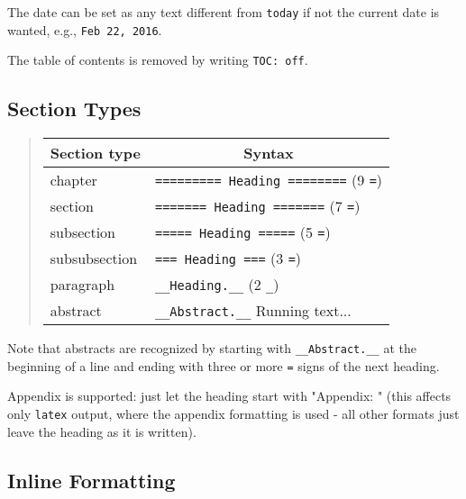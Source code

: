 \documentclass[twoside]{article}
\begin{document}
The date can be set as any text different from {\fontsize{10pt}{10pt}\verb!today!} if not the
current date is wanted, e.g., {\fontsize{10pt}{10pt}\verb!Feb 22, 2016!}.

The table of contents is removed by writing {\fontsize{10pt}{10pt}\verb!TOC: off!}.

\subsection{Section Types}

\label{quick:sections}


\begin{quote}\begin{tabular}{ll}
\hline
\multicolumn{1}{c}{Section type} & \multicolumn{1}{c}{Syntax} \\
\hline
chapter                              & {\fontsize{10pt}{10pt}\verb!========= Heading ========!} (9 {\fontsize{10pt}{10pt}\verb!=!}) \\
section                              & {\fontsize{10pt}{10pt}\verb!======= Heading =======!}    (7 {\fontsize{10pt}{10pt}\verb!=!}) \\
subsection                           & {\fontsize{10pt}{10pt}\verb!===== Heading =====!}        (5 {\fontsize{10pt}{10pt}\verb!=!}) \\
subsubsection                        & {\fontsize{10pt}{10pt}\verb!=== Heading ===!}            (3 {\fontsize{10pt}{10pt}\verb!=!}) \\
paragraph                            & {\fontsize{10pt}{10pt}\verb!__Heading.__!}               (2 {\fontsize{10pt}{10pt}\verb!_!}) \\
abstract                             & {\fontsize{10pt}{10pt}\verb!__Abstract.__!} Running text...      \\
\hline
\end{tabular}\end{quote}

\noindent
Note that abstracts are recognized by starting with {\fontsize{10pt}{10pt}\verb!__Abstract.__!} at
the beginning of a line and ending with three or more {\fontsize{10pt}{10pt}\verb!=!} signs of the
next heading.

Appendix is supported: just let the heading start with "Appendix: "
(this affects only {\fontsize{10pt}{10pt}\verb!latex!} output, where the appendix formatting
is used - all other formats just leave the heading as it is written).

\subsection{Inline Formatting}
\end{document}
